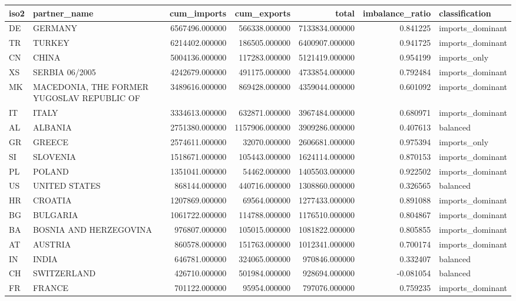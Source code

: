 \begin{tabular}{llrrrrl}
\toprule
iso2 & partner_name & cum_imports & cum_exports & total & imbalance_ratio & classification \\
\midrule
DE & GERMANY & 6567496.000000 & 566338.000000 & 7133834.000000 & 0.841225 & imports\_dominant \\
TR & TURKEY & 6214402.000000 & 186505.000000 & 6400907.000000 & 0.941725 & imports\_dominant \\
CN & CHINA & 5004136.000000 & 117283.000000 & 5121419.000000 & 0.954199 & imports\_only \\
XS & SERBIA 06/2005 & 4242679.000000 & 491175.000000 & 4733854.000000 & 0.792484 & imports\_dominant \\
MK & MACEDONIA, THE FORMER YUGOSLAV REPUBLIC OF & 3489616.000000 & 869428.000000 & 4359044.000000 & 0.601092 & imports\_dominant \\
IT & ITALY & 3334613.000000 & 632871.000000 & 3967484.000000 & 0.680971 & imports\_dominant \\
AL & ALBANIA & 2751380.000000 & 1157906.000000 & 3909286.000000 & 0.407613 & balanced \\
GR & GREECE & 2574611.000000 & 32070.000000 & 2606681.000000 & 0.975394 & imports\_only \\
SI & SLOVENIA & 1518671.000000 & 105443.000000 & 1624114.000000 & 0.870153 & imports\_dominant \\
PL & POLAND & 1351041.000000 & 54462.000000 & 1405503.000000 & 0.922502 & imports\_dominant \\
US & UNITED STATES & 868144.000000 & 440716.000000 & 1308860.000000 & 0.326565 & balanced \\
HR & CROATIA & 1207869.000000 & 69564.000000 & 1277433.000000 & 0.891088 & imports\_dominant \\
BG & BULGARIA & 1061722.000000 & 114788.000000 & 1176510.000000 & 0.804867 & imports\_dominant \\
BA & BOSNIA AND HERZEGOVINA & 976807.000000 & 105015.000000 & 1081822.000000 & 0.805855 & imports\_dominant \\
AT & AUSTRIA & 860578.000000 & 151763.000000 & 1012341.000000 & 0.700174 & imports\_dominant \\
IN & INDIA & 646781.000000 & 324065.000000 & 970846.000000 & 0.332407 & balanced \\
CH & SWITZERLAND & 426710.000000 & 501984.000000 & 928694.000000 & -0.081054 & balanced \\
FR & FRANCE & 701122.000000 & 95954.000000 & 797076.000000 & 0.759235 & imports\_dominant \\

\end{tabular}
